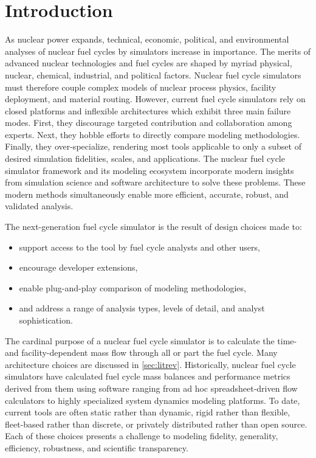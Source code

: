 
\section{Introduction}



As nuclear power expands, technical, economic, political, and environmental
analyses of nuclear fuel cycles by simulators increase in importance. The
merits of advanced nuclear technologies and fuel cycles are
shaped by myriad physical, nuclear, chemical, industrial, and political
factors. Nuclear fuel cycle simulators must therefore couple complex models of
nuclear process physics, facility deployment, and material routing. However,
current fuel cycle simulators rely on closed platforms and inflexible
architectures which exhibit three main failure modes. First, they discourage
targeted contribution and collaboration among experts. Next, they hobble
efforts to directly compare modeling methodologies. Finally, they
over-specialize, rendering most tools applicable to only a subset of desired
simulation fidelities, scales, and applications.  The \Cyclus nuclear fuel
cycle simulator framework and its modeling ecosystem incorporate modern
insights from simulation science and software architecture to solve these
problems.  These modern methods simultaneously enable more efficient, accurate,
robust, and validated analysis.

The \Cyclus next-generation fuel cycle simulator is the result of design
choices made to:
\begin{itemize}
\item support access to the tool by fuel cycle analysts and other users,
\item encourage developer extensions,
\item enable plug-and-play comparison of modeling methodologies,
\item and address a range of analysis types, levels of detail, and analyst sophistication.
\end{itemize}

The cardinal purpose of a nuclear fuel cycle simulator is to calculate the
time- and facility-dependent mass flow through all or part the fuel cycle. Many
architecture choices are discussed in \ref{sec:litrev}.  Historically, nuclear
fuel cycle simulators have calculated fuel cycle mass balances and performance
metrics derived from them using software ranging from ad hoc spreadsheet-driven
flow calculators to highly specialized system dynamics modeling platforms. To
date, current tools are often static rather than dynamic, rigid rather than
flexible, fleet-based rather than discrete, or privately distributed rather
than open source. Each of these choices presents a challenge to modeling
fidelity, generality, efficiency, robustness, and scientific transparency.

